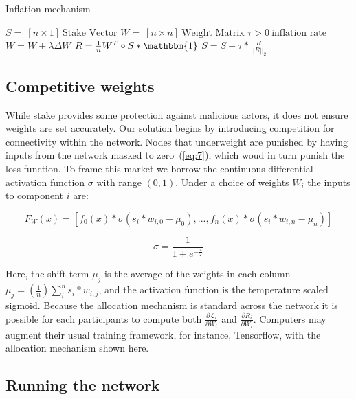 \documentclass{article}
\begin{document}
\begin{algorithm}
	\caption{Inflation mechanism}
	\begin{algorithmic} 
		
		\REQUIRE $S = \ [n \times 1] \ \textrm{Stake Vector}$
		\REQUIRE $W = \ [n \times n] \ \textrm{Weight Matrix}$
		\REQUIRE $\tau > 0 \ \textrm{inflation rate}$
		\STATE $W = W + \lambda \Delta W$
		\STATE $R = \frac{1}{n} W^T \circ S * \mathbbm{1}$
		\STATE $S = S + \tau * \frac{R}{||R||_2}  $
		\ENDWHILE
	\end{algorithmic}
\end{algorithm}

\subsection{Competitive weights}
\label{sec:competitive_weights}
While stake provides some protection against malicious actors, it does not ensure weights are set accurately. Our solution begins by introducing competition for connectivity within the network. Nodes that underweight are punished by having inputs from the network masked to zero~(\ref{eq:7}), which woud in turn punish the loss function. To frame this market we borrow the continuous differential activation function $\sigma$ with range $(0,1)$. Under a choice of weights $W_i$ the inputs to component $i$ are:

\begin{equation}
\label{eq:7}
F_W(x) =  [f_0(x) * \sigma(s_i * w_{i,0} - \mu_0),  ... , f_n(x) * \sigma(s_i * w_{i,n} - \mu_n)]
\end{equation}

\begin{equation}
\sigma =  \frac{1}{ 1 + e^{-\frac{x}{T}} }
\end{equation}

Here, the shift term $\mu_j$ is the average of the weights in each column $\mu_j = (\frac{1}{n}) \sum_{i}^{n}{s_i * w_{i,j}}$, and the activation function is the temperature scaled sigmoid. Because the allocation mechanism is standard across the network it is possible for each participants to compute both $\frac{\partial \mathcal{L}_i}{\partial W_i}$ and $\frac{\partial R_i}{\partial W_i}$. Computers may augment their usual training framework, for instance, Tensorflow, with the allocation mechanism shown here. 

\subsection{Running the network}
\end{document}
